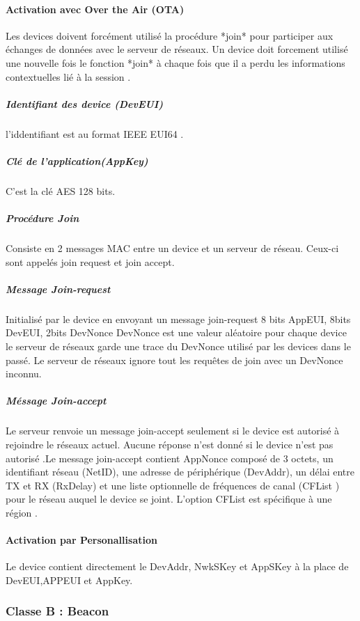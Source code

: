 \documentclass[11pt]{article}
\begin{document}
\paragraph{Activation avec Over the Air (OTA)}
Les devices doivent forcément utilisé la procédure *join* pour participer aux échanges de données avec le serveur de réseaux. Un device doit forcement utilisé une nouvelle fois le fonction *join* à chaque fois que il a perdu les informations contextuelles lié à la session .
\subparagraph{Identifiant des device (DevEUI)}
l'iddentifiant est au format IEEE EUI64 .
\subparagraph{Clé de l'application(AppKey)}
C'est la clé AES 128 bits.
\subparagraph{Procédure Join}
Consiste en 2 messages MAC entre un device et un serveur de réseau. Ceux-ci sont appelés join request et join accept.
\subparagraph{Message Join-request}
Initialisé par le device en envoyant un message join-request
8 bits AppEUI, 8bits DevEUI, 2bits DevNonce
DevNonce est une valeur aléatoire pour chaque device le serveur de réseaux garde une trace du DevNonce utilisé par les devices dans le passé.  Le serveur de réseaux ignore tout les requêtes de join avec un DevNonce inconnu.
\subparagraph{Méssage Join-accept }
Le serveur renvoie un message join-accept seulement si le device est autorisé à rejoindre le réseaux actuel.
Aucune réponse n'est donné si le device n'est pas autorisé .Le message join-accept contient AppNonce composé  de 3 octets, un identifiant réseau (NetID), une adresse de périphérique (DevAddr), un délai entre TX et RX (RxDelay) et une liste optionnelle de fréquences de canal (CFList ) pour le réseau auquel le device se joint. L'option CFList est spécifique à une région .
\paragraph{Activation par Personallisation }
Le device contient directement le DevAddr, NwkSKey et AppSKey à la place de DevEUI,APPEUI et AppKey.


\newpage
\subsubsection{Classe B : Beacon}
\end{document}
